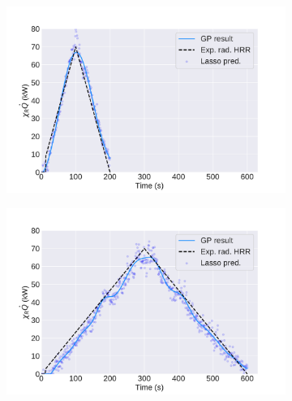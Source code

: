 \documentclass{article}
\begin{document}
\begin{figure}[htbp]
  \centering
  \begin{subfigure}[t]{.45\textwidth}
      \centering
      \includegraphics[width=\textwidth,keepaspectratio]{figures/dft_result_100s_triangle.pdf}
      \caption{}
      \label{fig:dft_result_100s_triangle}
  \end{subfigure}
  \begin{subfigure}[t]{.45\textwidth}
      \centering
      \includegraphics[width=\textwidth ,keepaspectratio]{figures/dft_result_300s_triangle.pdf}
      \caption{}
      \label{fig:dft_result_300s_triangle}
  \end{subfigure}
   \begin{subfigure}[t]{.45\textwidth}
      \centering

\end{subfigure}
\end{figure}
\end{document}
